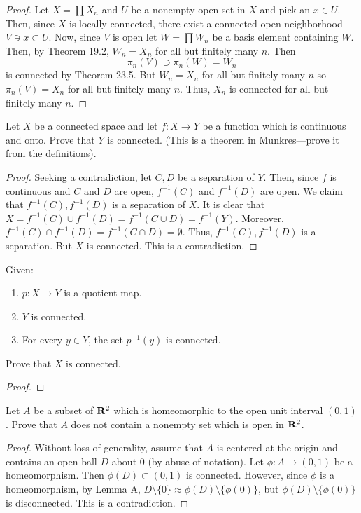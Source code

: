 \begin{proof}
Let $X=\prod X_n$ and $U$ be a nonempty open set in $X$ and pick
an $x\in U$. Then, since $X$ is locally connected, there exist a
connected open neighborhood $V\ni x\subset U$. Now, since $V$ is
open let $W=\prod W_n$ be a basis element containing $W$. Then,
by Theorem 19.2, $W_n=X_n$ for all but finitely many $n$. Then
\[
\pi_n(V)\supset \pi_n(W)=W_n
\]
is connected by Theorem 23.5. But $W_n=X_n$ for all but finitely
many $n$ so $\pi_n(V)=X_n$ for all but finitely many $n$. Thus,
$X_n$ is connected for all but finitely many $n$.
\end{proof}
\begin{problem}
Let $X$ be a connected space and let $f\colon X\to Y$ be a
function which is continuous and onto. Prove that $Y$ is
connected. (This is a theorem in Munkres---prove it from the
definitions).
\end{problem}
\begin{proof}
Seeking a contradiction, let $C,D$ be a separation of $Y$. Then,
since $f$ is continuous and $C$ and $D$ are open, $f^{-1}(C)$ and
$f^{-1}(D)$ are open. We claim that $f^{-1}(C),f^{-1}(D)$ is a
separation of $X$. It is clear that $X=f^{-1}(C)\cup
f^{-1}(D)=f^{-1}(C\cup D)=f^{-1}(Y)$. Moreover, $f^{-1}(C)\cap
f^{-1}(D)=f^{-1}(C\cap D)=\emptyset$. Thus, $f^{-1}(C),f^{-1}(D)$
is a separation. But $X$ is connected. This is a contradiction.
\end{proof}
\begin{problem}
Given:
\begin{enumerate}[noitemsep,label=(\roman*)]
\item $p\colon X\to Y$ is a quotient map.
\item $Y$ is connected.
\item For every $y\in Y$, the set $p^{-1}(y)$ is connected.
\end{enumerate}
Prove that $X$ is connected.
\end{problem}
\begin{proof}
\end{proof}
\begin{problem}
Let $A$ be a subset of $\mathbf{R}^2$ which is homeomorphic to the open
unit interval $(0,1)$. Prove that $A$ does not contain a nonempty
set which is open in $\mathbf{R}^2$.
\end{problem}
\begin{proof}
Without loss of generality, assume that $A$ is centered at the
origin and contains an open ball $D$ about $0$ (by abuse of
notation). Let $\phi\colon A\to(0,1)$ be a homeomorphism. Then
$\phi(D)\subset(0,1)$ is connected. However, since $\phi$ is a
homeomorphism, by Lemma A,
$D\setminus\{0\}\approx\phi(D)\setminus\{\phi(0)\}$, but
$\phi(D)\setminus\{\phi(0)\}$ is disconnected. This is a
contradiction.
\end{proof}
